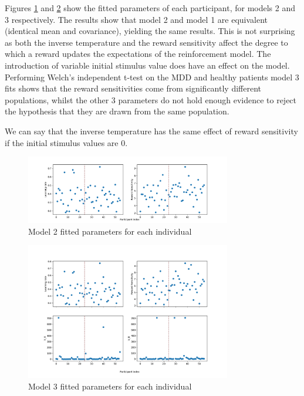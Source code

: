 \documentclass{article}
\begin{document}
Figures \ref{fig:model2parameterestimates} and \ref{fig:model3parameterestimates} show the fitted parameters of each participant, for models 2 and 3 respectively. The results show that model 2 and model 1 are equivalent (identical mean and covariance), yielding the same results. This is not surprising as both the inverse temperature and the reward sensitivity affect the degree to which a reward updates the expectations of the reinforcement model. The introduction of variable initial stimulus value does have an effect on the model. Performing Welch's independent t-test on the MDD and healthy patients model 3 fits shows that the reward sensitivities come from significantly different populations, whilst the other 3 parameters do not hold enough evidence to reject the hypothesis that they are drawn from the same population.

We can say that the inverse temperature has the same effect of reward sensitivity if the initial stimulus values are 0.

\begin{figure}[H]
  \centering
  \includegraphics[width=0.8\textwidth]{figures/part2/task8/model2_estimated_parameters.pdf}
  \caption{\centering Model 2 fitted parameters for each individual}
  \label{fig:model2parameterestimates}
\end{figure}

\begin{figure}[H]
  \centering
  \includegraphics[width=0.8\textwidth]{figures/part2/task8/model3_estimated_parameters.pdf}
  \caption{\centering Model 3 fitted parameters for each individual}
  \label{fig:model3parameterestimates}
\end{figure}
\end{document}
